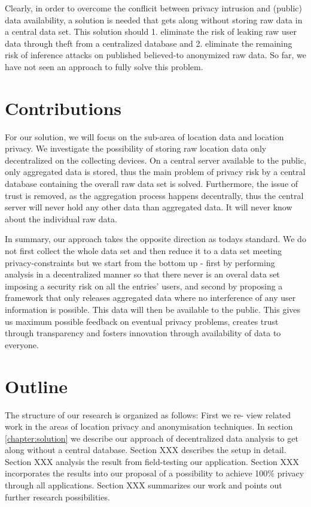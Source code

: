 Clearly, in order to overcome the conflicit between privacy intrusion and (public) data availability, a solution is needed that gets along without storing raw data in a central data set.
This solution should 1. eliminate the risk of leaking raw user data through theft from a centralized database and 2. eliminate the remaining risk of inference attacks on published believed-to anonymized raw data. So far, we have not seen an approach to fully solve this problem.\\

\section{Contributions}
For our solution, we will focus on the sub-area of location data and location privacy.
We investigate the possibility of storing raw location data only decentralized on the collecting devices. On a central server available to the public, only aggregated data is stored, thus the main problem of privacy risk by a central database containing the overall raw data set is solved. Furthermore, the issue of trust is removed, as the aggregation process happens decentrally, thus the central server will never hold any other data than aggregated data. It will never know about the individual raw data.

In summary, our approach takes the opposite direction as todays standard. We do not first collect the whole data set and then reduce it to a data set meeting privacy-constraints but we start from the bottom up - first by performing analysis in a decentralized manner so that there never is an overal data set imposing a security risk on all the entries' users, and second by proposing a framework that only releases aggregated data where no interference of any user information is possible. This data will then be available to the public. This gives us maximum possible feedback on eventual privacy problems, creates trust through transparency and fosters innovation through availability of data to everyone.


\section{Outline}
The structure of our research is organized as follows: First we re-
view related work in the areas of location privacy and anonymisation techniques. In
section \ref{chapter:solution} we describe our approach of decentralized data analysis to get along without a central database.
Section XXX describes the setup in detail. Section XXX analysis the result from field-testing our application.
Section XXX incorporates the results into our proposal of a possibility to achieve 100\% privacy through all applications.
Section XXX summarizes our work and points out further research possibilities.


